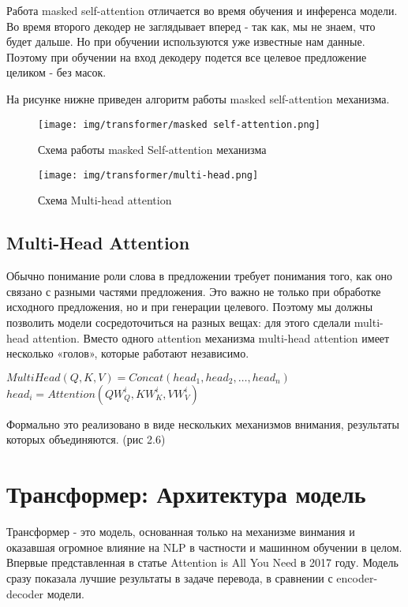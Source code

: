 \documentclass[PMI,KR]{HSEUniversity}
\begin{document}
Работа masked self-attention отличается во время обучения и инференса модели. Во время второго декодер не заглядывает вперед - так как, мы не знаем, что будет дальше. Но при обучении используются уже известные нам данные. Поэтому при обучении на вход декодеру подется все целевое предложение целиком - без масок.

На рисунке нижне приведен алгоритм работы masked self-attention механизма.

\begin{figure}[h]
    \centering
    \texttt{[image: img/transformer/masked self-attention.png]}
    \caption{Схема работы masked Self-attention механизма}
\end{figure}

\begin{figure}[h]
    \centering
    \texttt{[image: img/transformer/multi-head.png]}
    \caption{Схема Multi-head attention}
\end{figure}

\subsection{Multi-Head Attention}

Обычно понимание роли слова в предложении требует понимания того, как оно связано с разными частями предложения. Это важно не только при обработке исходного предложения, но и при генерации целевого. 
Поэтому мы должны позволить модели сосредоточиться на разных вещах: для этого сделали multi-head attention. Вместо одного attention механизма multi-head attention имеет несколько «голов», которые работают независимо.

\begin{center}
$MultiHead(Q, K, V) = Concat(head_{1}, head_{2}, \dots, head_{n})$ \\
$head_{i} = Attention(QW^{i}_{Q}, KW^{i}_{K}, VW^{i}_{V})$
\end{center}

Формально это реализовано в виде нескольких механизмов внимания, результаты которых объединяются. (рис 2.6)

\newpage
\section{Трансформер: Архитектура модель}

Трансформер - это модель, основанная только на механизме винмания и оказавшая огромное влияние на NLP в частности и машинном обучении в целом. Впервые представленная в статье Attention is All You Need\cite{allyouneed:2017} в 2017 году. 
Модель сразу показала лучшие результаты в задаче перевода, в сравнении с encoder-decoder модели. 
\end{document}
